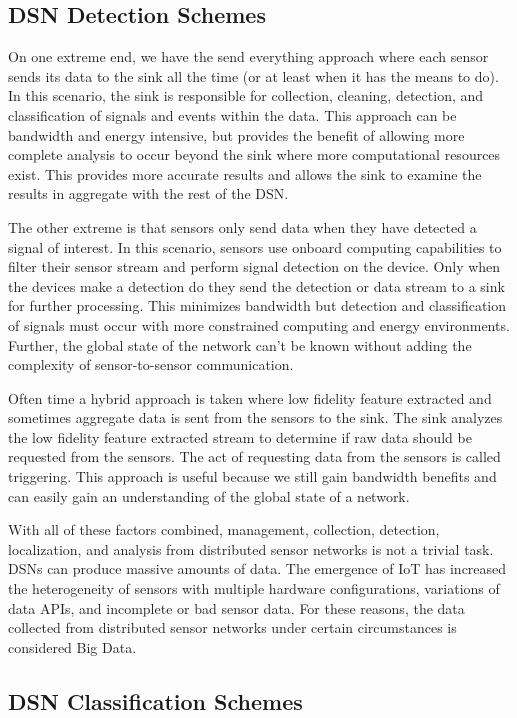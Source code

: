 \subsection{DSN Detection Schemes}
On one extreme end, we have the send everything approach where each sensor sends its data to the sink all the time (or at least when it has the means to do). In this scenario, the sink is responsible for collection, cleaning, detection, and classification of signals and events within the data. This approach can be bandwidth and energy intensive, but provides the benefit of allowing more complete analysis to occur beyond the sink where more computational resources exist. This provides more accurate results and allows the sink to examine the results in aggregate with the rest of the DSN.

The other extreme is that sensors only send data when they have detected a signal of interest. In this scenario, sensors use onboard computing capabilities to filter their sensor stream and perform signal detection on the device. Only when the devices make a detection do they send the detection or data stream to a sink for further processing. This minimizes bandwidth but detection and classification of signals must occur with more constrained computing and energy environments. Further, the global state of the network can't be known without adding the complexity of sensor-to-sensor communication.

Often time a hybrid approach is taken where low fidelity feature extracted and sometimes aggregate data is sent from the sensors to the sink. The sink analyzes the low fidelity feature extracted stream to determine if raw data should be requested from the sensors. The act of requesting data from the sensors is called triggering. This approach is useful because we still gain bandwidth benefits and can easily gain an understanding of the global state of a network.

With all of these factors combined, management, collection, detection, localization, and analysis from distributed sensor networks is not a trivial task. DSNs can produce massive amounts of data. The emergence of IoT has increased the heterogeneity of sensors with multiple hardware configurations, variations of data APIs, and incomplete or bad sensor data. For these reasons, the data collected from distributed sensor networks under certain circumstances is considered Big Data.

\subsection{DSN Classification Schemes}

